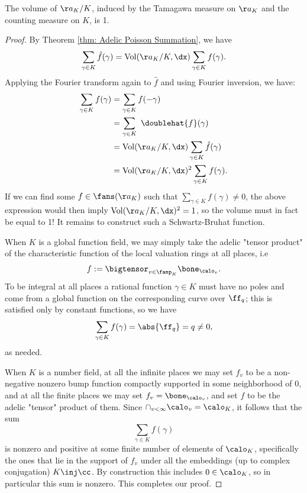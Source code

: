 \documentclass[11pt, x11names, openany]{book}
\begin{document}
\begin{corollary}
    \label{cor: volume of A_K/K is 1}
    The volume of $\aa_K/K$, induced by the Tamagawa measure on $\aa_K$ and the counting measure on $K$, is 1.
\end{corollary}
\begin{proof}
    By Theorem \ref{thm: Adelic Poisson Summation}, we have
    \begin{equation*}
        \sum_{\gamma \in K}\hat{f}(\gamma) = \vol(\aa_K/K, \dx) \sum_{\gamma \in K} f(\gamma).
    \end{equation*}
    Applying the Fourier transform again to $\hat{f}$ and using Fourier inversion, we have:
    \begin{align*}
    \sum_{\gamma \in K} f(\gamma) &= \sum_{\gamma \in K} f(-\gamma)\\
     &= \sum_{\gamma \in K} \ \doublehat{f}(\gamma)\\
    &= \vol(\aa_K/K, \dx) \sum_{\gamma \in K} \hat{f}(\gamma)\\
    &= \vol(\aa_K/K, \dx)^2 \sum_{\gamma \in K} f(\gamma).
    \end{align*}
    If we can find some $f \in \fans(\aa_K)$ such that $\sum_{\gamma \in K} f(\gamma) \neq 0$, the above expression would then imply $\vol(\aa_K/K, \dx)^2 = 1$, so the volume must in fact be equal to 1! It remains to construct such a Schwartz-Bruhat function.

    When $K$ is a global function field, we may simply take the adelic "tensor product" of the characteristic function of the local valuation rings at all places, i.e
    \begin{equation*}
        f := \bigtensor_{v \in \fanp_K} \bone_{\calo_v}.
    \end{equation*}
    To be integral at all places a rational function $\gamma \in K$ must have no poles and come from a global function on the corresponding curve over $\ff_q$; this is satisfied only by constant functions, so we have
    \begin{equation*}
        \sum_{\gamma \in K} f(\gamma) = \abs{\ff_q} = q \neq 0,
    \end{equation*}
    as needed.

    When $K$ is a number field, at all the infinite places we may set $f_v$ to be a non-negative nonzero bump function compactly supported in some neighborhood of 0, and at all the finite places we may set $f_v = \bone_{\calo_v}$, and set $f$ to be the adelic "tensor" product of them. Since $\cap_{v < \infty} \calo_v = \calo_K$, it follows that the sum
    \begin{equation*}
        \sum_{\gamma \in K} f(\gamma)
    \end{equation*}
    is nonzero and positive at some finite number of elements of $\calo_K$, specifically the ones that lie in the support of $f_v$ under all the embeddings (up to complex conjugation) $K \inj \cc$. By construction this includes $0 \in \calo_K$, so in particular this sum is nonzero. This completes our proof.
\end{proof}
\end{document}
